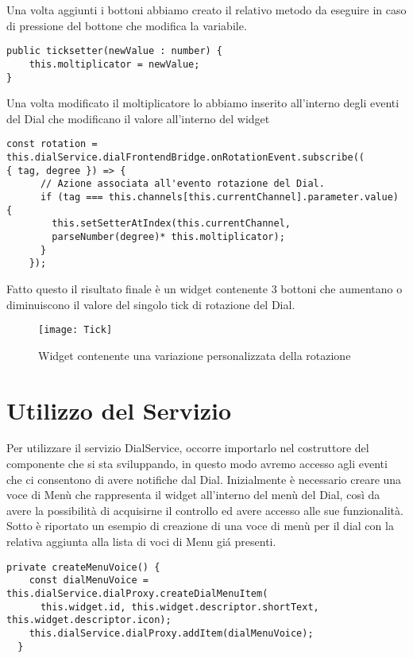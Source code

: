Una volta aggiunti i bottoni abbiamo creato il relativo metodo da eseguire in caso di pressione del bottone che modifica la variabile.
\vspace{0.5cm}
\begin{lstlisting}[caption={Modifica del moltiplicatore},style=javaScriptCode]
public ticksetter(newValue : number) {
    this.moltiplicator = newValue;
}
\end{lstlisting} 
\vspace{1.0cm}
Una volta modificato il moltiplicatore lo abbiamo inserito all'interno degli eventi del Dial che modificano il valore all'interno del widget
\vspace{1.0cm}
\begin{lstlisting}[caption={Utilizzo del moltiplicatore},style=javaScriptCode]
const rotation = 
this.dialService.dialFrontendBridge.onRotationEvent.subscribe((
{ tag, degree }) => {
      // Azione associata all'evento rotazione del Dial.
      if (tag === this.channels[this.currentChannel].parameter.value) {
        this.setSetterAtIndex(this.currentChannel, 
        parseNumber(degree)* this.moltiplicator);
      }
    });
\end{lstlisting} 
\vspace{1.0cm}
Fatto questo il risultato finale è un widget contenente 3 bottoni che aumentano o diminuiscono il valore del singolo tick di rotazione del Dial.
\begin{figure}[htpb!]
\center
  \texttt{[image: Tick]}
  \caption{Widget contenente una variazione personalizzata della rotazione}
\end{figure}

\section{Utilizzo del Servizio}

Per utilizzare il servizio DialService, occorre importarlo nel costruttore del componente che si sta sviluppando, in questo modo avremo accesso agli eventi che ci consentono di avere notifiche dal Dial.
Inizialmente è necessario creare una voce di Menù che rappresenta il widget all’interno del menù del Dial, così da avere la possibilità di acquisirne il controllo ed avere accesso alle sue funzionalità.
Sotto è riportato un esempio di creazione di una voce di menù per il dial con la relativa aggiunta alla lista di voci di Menu giá presenti.

\vspace{1.0cm}
\begin{lstlisting}[caption={Creazione nuova voce da widget},style=javaScriptCode]
  private createMenuVoice() {
    const dialMenuVoice = this.dialService.dialProxy.createDialMenuItem(
      this.widget.id, this.widget.descriptor.shortText, this.widget.descriptor.icon);
    this.dialService.dialProxy.addItem(dialMenuVoice);
  }
\end{lstlisting} 
\vspace{1.0cm}

